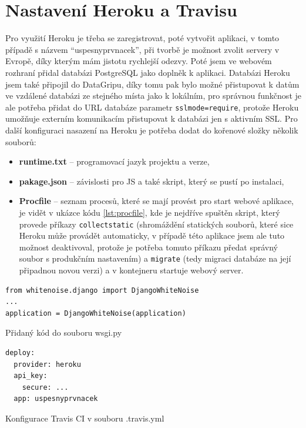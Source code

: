     \section{Nastavení Heroku a Travisu}
    Pro využití Heroku je třeba se zaregistrovat, poté vytvořit aplikaci, v tomto případě s názvem \enquote{uspesnyprvnacek}, při tvorbě je možnost zvolit servery v Evropě, díky kterým mám jistotu rychlejší odezvy. Poté jsem ve webovém rozhraní přidal databázi PostgreSQL jako doplněk k aplikaci. Databázi Heroku jsem také připojil do DataGripu, díky tomu pak bylo možné přistupovat k datům ve vzdálené databázi ze stejného místa jako k lokálním, pro správnou funkčnost je ale potřeba přidat do URL databáze parametr \verb|sslmode=require|, protože Heroku umožňuje externím komunikacím přistupovat k databázi jen s aktivním SSL. Pro další konfiguraci nasazení na Heroku je potřeba dodat do kořenové složky několik souborů:
    \begin{itemize}
        \item \textbf{runtime.txt} -- programovací jazyk projektu a verze,
        \item \textbf{pakage.json} -- závislosti pro JS a také skript, který se pustí po instalaci,
        \item \textbf{Procfile} -- seznam procesů, které se mají provést pro start webové aplikace, je vidět v ukázce kódu \ref{lst:procfile}, kde je nejdříve spuštěn skript, který provede příkazy \verb|collectstatic| (shromáždění statických souborů, které sice Heroku může provádět automaticky, v případě této aplikace jsem ale tuto možnost deaktivoval, protože je potřeba tomuto příkazu předat správný soubor s produkčním nastavením) a \verb|migrate| (tedy migraci databáze na její připadnou novou verzi) a v kontejneru startuje webový server.
    \end{itemize}
    
    \begin{listing}[ht]
    	\begin{verbatim}
from whitenoise.django import DjangoWhiteNoise
...
application = DjangoWhiteNoise(application)
    	\end{verbatim}
    	\caption{Přidaný kód do souboru wsgi.py}\label{lst:wsgi}
    \end{listing}
    
    \begin{listing}[ht]
    	\begin{verbatim}
deploy:
  provider: heroku
  api_key:
    secure: ...
  app: uspesnyprvnacek
    	\end{verbatim}
    	\caption{Konfigurace Travis CI v souboru .travis.yml}\label{travis2}
    \end{listing}
    
